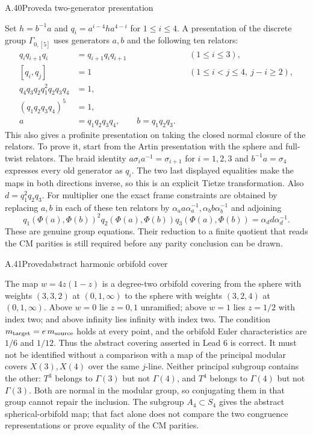 \begin{statement}{A.40}{Proved}{a two-generator presentation}
\end{statement}
Set $h=b^{-1}a$ and $q_i=a^{i-4}ha^{4-i}$ for $1\leq i\leq4$.
A presentation of the discrete group $\Gamma_{0,[5]}$ uses generators
$a,b$ and the following ten relators:
\begin{align*}
 q_iq_{i+1}q_i&=q_{i+1}q_iq_{i+1}&&(1\leq i\leq3),\\
 [q_i,q_j]&=1&&(1\leq i<j\leq4,\ j-i\geq2),\\
 q_4q_3q_2q_1^2q_2q_3q_4&=1,\\
 (q_1q_2q_3q_4)^5&=1,\\
 a&=q_1q_2q_3q_4,\qquad b=q_1q_2q_3.
\end{align*}
This also gives a profinite presentation on taking the closed normal
closure of the relators. To prove it, start from the Artin presentation
with the sphere and full-twist relators. The braid identity
$a\sigma_i a^{-1}=\sigma_{i+1}$ for $i=1,2,3$ and
$b^{-1}a=\sigma_4$ expresses every old generator as $q_i$.
The two last displayed equalities make the maps in both directions
inverse, so this is an explicit Tietze transformation. Also
$d=q_1^2q_2q_3$.
For multiplier one the exact frame constraints are obtained by replacing
$a,b$ in each of these ten relators by
$\alpha_a a\alpha_a^{-1},\alpha_b b\alpha_b^{-1}$ and adjoining
\[
 q_1(\Phi(a),\Phi(b))^2q_2(\Phi(a),\Phi(b))q_3(\Phi(a),\Phi(b))
 =\alpha_d d\alpha_d^{-1}.
\]
These are genuine group equations. Their reduction to a finite quotient
that reads the CM parities is still required before any parity conclusion
can be drawn.

\begin{statement}{A.41}{Proved}{abstract harmonic orbifold cover}
\end{statement}
The map $w=4z(1-z)$ is a degree-two orbifold covering from the sphere with
weights $(3,3,2)$ at $(0,1,\infty)$ to the sphere with weights $(3,2,4)$ at
$(0,1,\infty)$. Above $w=0$ lie $z=0,1$ unramified; above $w=1$ lies
$z=1/2$ with index two; and above infinity lies infinity with index two.
The condition $m_{\rm target}=e\,m_{\rm source}$ holds at every point,
and the orbifold Euler characteristics are $1/6$ and $1/12$.
Thus the abstract covering asserted in Lead 6 is correct.
It must not be identified without a comparison with a map of the
principal modular covers $X(3),X(4)$ over the same $j$-line.
Neither principal subgroup contains the other: $T^3$ belongs to
$\Gamma(3)$ but not $\Gamma(4)$, and $T^4$ belongs to
$\Gamma(4)$ but not $\Gamma(3)$. Both are normal in the modular group,
so conjugating them in that group cannot repair the inclusion.
The subgroup $A_4\subset S_4$ gives the abstract spherical-orbifold map;
that fact alone does not compare the two congruence representations or
prove equality of the CM parities.

